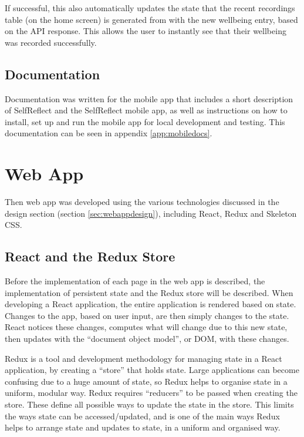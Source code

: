 \documentclass[11pt,openright,a4paper]{report}
\begin{document}
If successful, this also automatically updates the state that the recent recordings table (on the home screen) is generated from with the new wellbeing entry, based on the API response. This allows the user to instantly see that their wellbeing was recorded successfully.

\subsection{Documentation}
Documentation was written for the mobile app that includes a short description of SelfReflect and the SelfReflect mobile app, as well as instructions on how to install, set up and run the mobile app for local development and testing. This documentation can be seen in appendix \ref{app:mobiledocs}.

\section{Web App}
Then web app was developed using the various technologies discussed in the design section (section \ref{sec:webappdesign}), including React, Redux and Skeleton CSS.

\subsection{React and the Redux Store}
Before the implementation of each page in the web app is described, the implementation of persistent state and the Redux store will be described. When developing a React application, the entire application is rendered based on state. Changes to the app, based on user input, are then simply changes to the state. React notices these changes, computes what will change due to this new state, then updates with the \enquote{document object model}, or DOM, with these changes.

Redux is a tool and development methodology for managing state in a React application, by creating a \enquote{store} that holds state. Large applications can become confusing due to a huge amount of state, so Redux helps to organise state in a uniform, modular way. Redux requires \enquote{reducers} to be passed when creating the store. These define all possible ways to update the state in the store. This limits the ways state can be accessed/updated, and is one of the main ways Redux helps to arrange state and updates to state, in a uniform and organised way.
\end{document}
